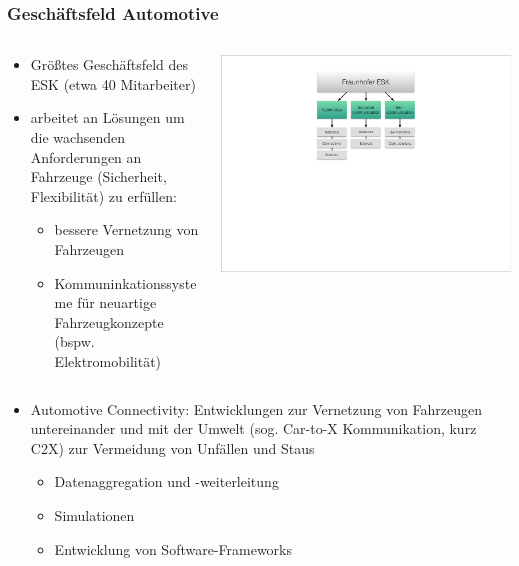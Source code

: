 \begin{frame}[t] \frametitle{Gesch\"aftsfeld Automotive}
  \begin{columns}
    \begin{column}{0.55\textwidth}
      \begin{itemize}
      \item Gr\"o\ss tes Gesch\"aftsfeld des ESK (etwa 40 Mitarbeiter)
      \item arbeitet an L\"osungen um die wachsenden Anforderungen an Fahrzeuge (Sicherheit, Flexibilit\"at) zu erf\"ullen:
        \begin{itemize}
          \item bessere Vernetzung von Fahrzeugen
          \item Kommuninkationssysteme f\"ur neuartige Fahrzeugkonzepte (bspw. Elektromobilit\"at)
        \end{itemize}
      \end{itemize}
    \end{column}
    \begin{column}{0.4\textwidth}
      \includegraphics[width=1\textwidth]{pics/chartFraunhofer}
    \end{column}
  \end{columns}
  \begin{itemize}
  \item Automotive Connectivity: Entwicklungen zur Vernetzung von Fahrzeugen untereinander und mit der Umwelt (sog. Car-to-X Kommunikation, kurz C2X) zur Vermeidung von Unf\"allen und Staus
    \begin{itemize}
      \item Datenaggregation und -weiterleitung
      \item Simulationen
      \item Entwicklung von Software-Frameworks
    \end{itemize}
  \end{itemize}
\end{frame}
